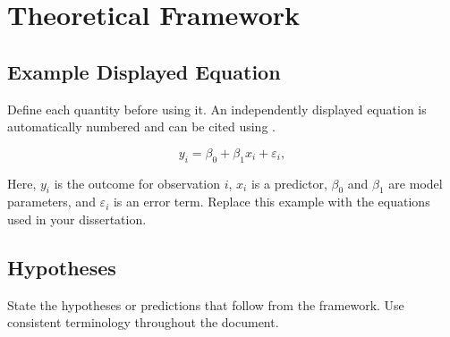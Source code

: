 \chapter{Theoretical Framework}\label{chap:theory}

\section{Example Displayed Equation}

Define each quantity before using it. An independently displayed equation is automatically numbered and can be cited using .

\begin{equation}
  y_i = \beta_0 + \beta_1 x_i + \varepsilon_i,
  \label{eq:example-model}
\end{equation}

Here, $y_i$ is the outcome for observation $i$, $x_i$ is a predictor, $\beta_0$ and $\beta_1$ are model parameters, and $\varepsilon_i$ is an error term. Replace this example with the equations used in your dissertation.

\section{Hypotheses}

State the hypotheses or predictions that follow from the framework. Use consistent terminology throughout the document.
